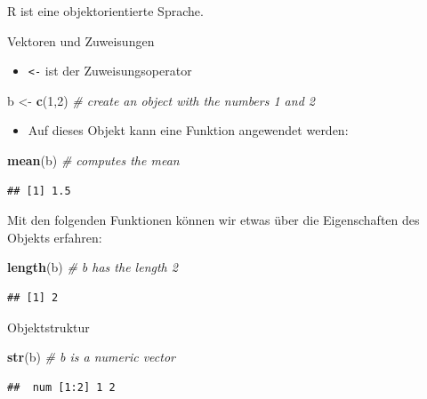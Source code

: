 \documentclass[ignorenonframetext,]{beamer}
\newenvironment{Shaded}{\begin{snugshade}}{\end{snugshade}}
\newcommand{\KeywordTok}[1]{\textcolor[rgb]{0.13,0.29,0.53}{\textbf{#1}}}
\newcommand{\DecValTok}[1]{\textcolor[rgb]{0.00,0.00,0.81}{#1}}
\newcommand{\StringTok}[1]{\textcolor[rgb]{0.31,0.60,0.02}{#1}}
\newcommand{\CommentTok}[1]{\textcolor[rgb]{0.56,0.35,0.01}{\textit{#1}}}
\newcommand{\NormalTok}[1]{#1}
\providecommand{\tightlist}{%
  \setlength{\itemsep}{0pt}\setlength{\parskip}{0pt}}
\begin{document}
\begin{frame}[fragile]{R ist eine objektorientierte Sprache.}

\begin{block}{Vektoren und Zuweisungen}

\begin{itemize}
\tightlist
\item
  \texttt{\textless{}-} ist der Zuweisungsoperator
\end{itemize}

\begin{Shaded}
\begin{Highlighting}[]
\NormalTok{b <-}\StringTok{ }\KeywordTok{c}\NormalTok{(}\DecValTok{1}\NormalTok{,}\DecValTok{2}\NormalTok{) }\CommentTok{# create an object with the numbers 1 and 2}
\end{Highlighting}
\end{Shaded}

\begin{itemize}
\tightlist
\item
  Auf dieses Objekt kann eine Funktion angewendet werden:
\end{itemize}

\begin{Shaded}
\begin{Highlighting}[]
\KeywordTok{mean}\NormalTok{(b) }\CommentTok{# computes the mean}
\end{Highlighting}
\end{Shaded}

\begin{verbatim}
## [1] 1.5
\end{verbatim}

Mit den folgenden Funktionen können wir etwas über die Eigenschaften des
Objekts erfahren:

\begin{Shaded}
\begin{Highlighting}[]
\KeywordTok{length}\NormalTok{(b) }\CommentTok{# b has the length 2}
\end{Highlighting}
\end{Shaded}

\begin{verbatim}
## [1] 2
\end{verbatim}

\end{block}

\begin{block}{Objektstruktur}

\begin{Shaded}
\begin{Highlighting}[]
\KeywordTok{str}\NormalTok{(b) }\CommentTok{# b is a numeric vector}
\end{Highlighting}
\end{Shaded}

\begin{verbatim}
##  num [1:2] 1 2
\end{verbatim}

\end{block}

\end{frame}
\end{document}
